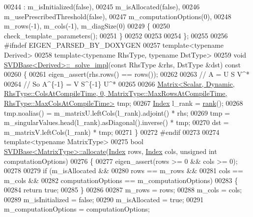 \begin{DoxyCode}
00244     : m\_isInitialized(false),
00245       m\_isAllocated(false),
00246       m\_usePrescribedThreshold(false),
00247       m\_computationOptions(0),
00248       m\_rows(-1), m\_cols(-1), m\_diagSize(0)
00249   \{
00250     check\_template\_parameters();
00251   \}
00252 
00253 
00254 \};
00255 
00256 \textcolor{preprocessor}{#ifndef EIGEN\_PARSED\_BY\_DOXYGEN}
00257 \textcolor{keyword}{template}<\textcolor{keyword}{typename} Derived>
00258 \textcolor{keyword}{template}<\textcolor{keyword}{typename} RhsType, \textcolor{keyword}{typename} DstType>
00259 \textcolor{keywordtype}{void} \hyperlink{group___s_v_d___module_class_eigen_1_1_s_v_d_base}{SVDBase<Derived>::\_solve\_impl}(\textcolor{keyword}{const} RhsType &rhs, DstType &dst)\textcolor{keyword}{ const}
00260 \textcolor{keyword}{}\{
00261   eigen\_assert(rhs.rows() == rows());
00262 
00263   \textcolor{comment}{// A = U S V^*}
00264   \textcolor{comment}{// So A^\{-1\} = V S^\{-1\} U^*}
00265 
00266   
      \hyperlink{group___core___module_class_eigen_1_1_matrix}{Matrix<Scalar, Dynamic, RhsType::ColsAtCompileTime, 0, MatrixType::MaxRowsAtCompileTime,
       RhsType::MaxColsAtCompileTime>}
       tmp;
00267   \hyperlink{group___s_v_d___module_a6229a37997eca1072b52cca5ee7a2bec}{Index} l\_rank = \hyperlink{group___s_v_d___module_a30b89e24f42f1692079eea31b361d26a}{rank}();
00268   tmp.noalias() =  m\_matrixU.leftCols(l\_rank).adjoint() * rhs;
00269   tmp = m\_singularValues.head(l\_rank).asDiagonal().inverse() * tmp;
00270   dst = m\_matrixV.leftCols(l\_rank) * tmp;
00271 \}
00272 \textcolor{preprocessor}{#endif}
00273 
00274 \textcolor{keyword}{template}<\textcolor{keyword}{typename} MatrixType>
00275 \textcolor{keywordtype}{bool} \hyperlink{group___s_v_d___module_class_eigen_1_1_s_v_d_base}{SVDBase<MatrixType>::allocate}(\hyperlink{group___s_v_d___module_a6229a37997eca1072b52cca5ee7a2bec}{Index} rows, 
      \hyperlink{group___s_v_d___module_a6229a37997eca1072b52cca5ee7a2bec}{Index} cols, \textcolor{keywordtype}{unsigned} \textcolor{keywordtype}{int} computationOptions)
00276 \{
00277   eigen\_assert(rows >= 0 && cols >= 0);
00278 
00279   \textcolor{keywordflow}{if} (m\_isAllocated &&
00280       rows == m\_rows &&
00281       cols == m\_cols &&
00282       computationOptions == m\_computationOptions)
00283   \{
00284     \textcolor{keywordflow}{return} \textcolor{keyword}{true};
00285   \}
00286 
00287   m\_rows = rows;
00288   m\_cols = cols;
00289   m\_isInitialized = \textcolor{keyword}{false};
00290   m\_isAllocated = \textcolor{keyword}{true};
00291   m\_computationOptions = computationOptions;

\end{DoxyCode}
